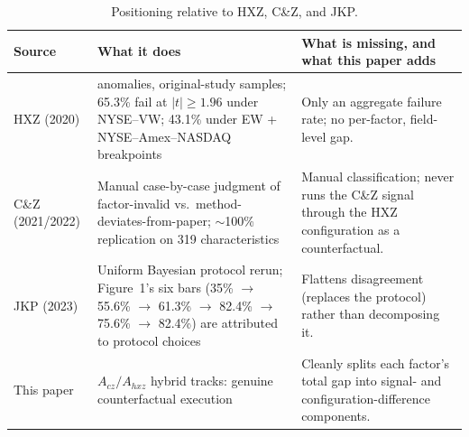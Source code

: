\begin{table}[htbp]
  \centering
  \small
  \caption{Positioning relative to HXZ, C\&Z, and JKP.}
  \label{tab:related-work}
  \begin{tabular}{@{}p{2.25cm}>{\raggedright\arraybackslash}p{5.9cm}>{\raggedright\arraybackslash}p{5.9cm}@{}}
    \toprule
    Source & What it does & What is missing, and what this paper adds \\
    \midrule
    HXZ (2020) &
    452 anomalies, original-study samples; 65.3\% fail at $|t| \geq 1.96$
    under NYSE--VW; 43.1\% under EW + NYSE--Amex--NASDAQ breakpoints &
    Only an aggregate failure rate; no per-factor, field-level gap. \\
    \addlinespace

    C\&Z (2021/2022) &
    Manual case-by-case judgment of factor-invalid vs.\ method-deviates-from-paper;
    $\sim$100\% replication on 319 characteristics &
    Manual classification; never runs the C\&Z signal through the HXZ
    configuration as a counterfactual. \\
    \addlinespace

    JKP (2023) &
    Uniform Bayesian protocol rerun; Figure~1's six bars
    (35\% $\to$ 55.6\% $\to$ 61.3\% $\to$ 82.4\% $\to$ 75.6\% $\to$ 82.4\%)
    are attributed to protocol choices &
    Flattens disagreement (replaces the protocol) rather than decomposing it. \\
    \addlinespace

    This paper &
    $A_{cz}/A_{hxz}$ hybrid tracks: genuine counterfactual execution &
    Cleanly splits each factor's total gap into signal- and
    configuration-difference components. \\
    \bottomrule
  \end{tabular}
\end{table}
